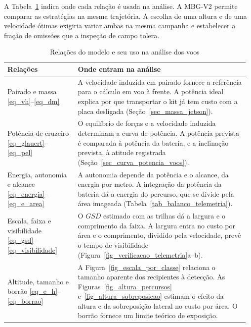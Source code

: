 A Tabela~\ref{tab_relacoes_analise} indica onde cada relação é usada na análise. A MBG-V2 permite comparar as estratégias na mesma trajetória. A escolha de uma altura e de uma velocidade ótimas exigiria variar ambas na mesma campanha e estabelecer a fração de omissões que a inspeção de campo tolera.

\begin{table}[!htbp]
  \centering
  \caption{Relações do modelo e seu uso na análise dos voos}
  \label{tab_relacoes_analise}
  \small
  \renewcommand{\arraystretch}{1.16}
  \begin{tabular}{@{}>{\raggedright\arraybackslash}p{0.29\linewidth}@{\hspace{0.03\linewidth}}>{\raggedright\arraybackslash}p{0.68\linewidth}@{}}
    \hline
    Relações & Onde entram na análise \\
    \hline
    Pairado e massa \newline \eqref{eq_vh}--\eqref{eq_dm}
      & A velocidade induzida em pairado fornece a referência para o cálculo em voo à frente. A potência ideal explica por que transportar o kit já tem custo com a placa desligada (Seção~\ref{sec_massa_jetson}). \\
    Potência de cruzeiro \newline \eqref{eq_glauert}--\eqref{eq_pel}
      & O equilíbrio de forças e a velocidade induzida determinam a curva de potência. A potência prevista é comparada à potência da bateria, e a inclinação prevista, à atitude registrada (Seção~\ref{sec_curva_potencia_voos}). \\
    Energia, autonomia e alcance \newline \eqref{eq_energia}--\eqref{eq_e_area}
      & A autonomia depende da potência e o alcance, da energia por metro. A integração da potência da bateria dá a energia do percurso, que se divide pela área imageada (Tabela~\ref{tab_balanco_telemetria}). \\
    Escala, faixa e visibilidade \newline \eqref{eq_gsd}--\eqref{eq_visibilidade}
      & O $GSD$ estimado com as trilhas dá a largura e o comprimento da faixa. A largura entra no custo por área e o comprimento, dividido pela velocidade, prevê o tempo de visibilidade (Figura~\ref{fig_verificacao_telemetria}a--b). \\
    Altitude, tamanho e borrão \newline \eqref{eq_e_h}--\eqref{eq_borrao}
      & A Figura~\ref{fig_escala_por_classe} relaciona o tamanho aparente dos recipientes à detecção. As Figuras~\ref{fig_altura_percursos} e~\ref{fig_altura_sobreposicao} estimam o efeito da altura e da sobreposição lateral no custo por área. O borrão fornece um limite teórico de exposição. \\

\end{tabular}
\end{table}
